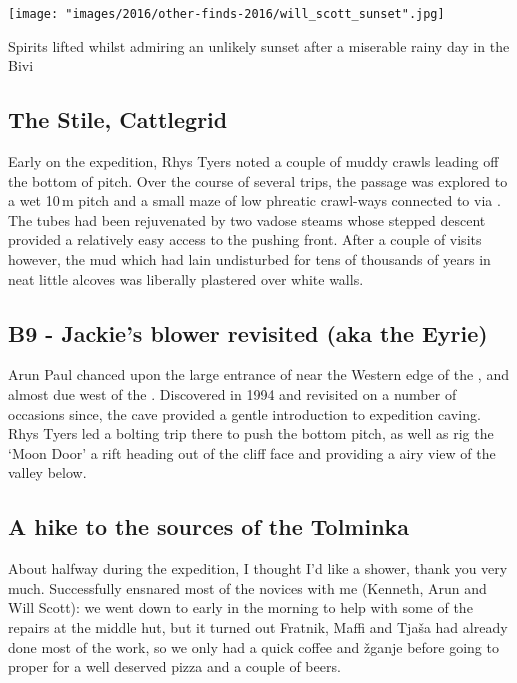\begin{marginfigure}
\checkoddpage \ifoddpage \forcerectofloat \else \forceversofloat \fi
\centering
 \texttt{[image: "images/2016/other-finds-2016/will\_scott\_sunset".jpg]} 
 \caption{Spirits lifted whilst admiring an unlikely sunset after a miserable rainy day in the Bivi }
 \label{Sunset}
\end{marginfigure}



\subsection{The Stile, Cattlegrid}
Early on the expedition, Rhys Tyers noted a couple of muddy crawls leading off the bottom of  pitch. Over the course of several trips, the  passage was explored to a wet 10\,m pitch and a small maze of low phreatic crawl-ways connected to  via . The tubes had been rejuvenated by two vadose steams whose stepped descent provided a relatively easy access to the pushing front. After a couple of visits however, the mud which had lain undisturbed for tens of thousands of years in neat little alcoves was liberally plastered over white walls.

\subsection{B9 - Jackie's blower revisited (aka the Eyrie)}
Arun Paul chanced upon the large entrance of  near the Western edge of the , and almost due west of the . Discovered in 1994 and revisited on a number of occasions since, the cave provided a gentle introduction to expedition caving. Rhys Tyers led a bolting trip there to push the bottom pitch, as well as rig the `Moon Door' a rift heading out of the cliff face and providing a airy view of the  valley below.

 \subsection{A hike to the sources of the Tolminka}
 About halfway during the expedition, I thought I'd like a shower, thank you very much. Successfully ensnared most of the novices with me (Kenneth, Arun and Will Scott): we went down to  early in the morning to help with some of the repairs at the middle hut, but it turned out Fratnik, Maffi and Tja\v{s}a had already done most of the work, so we only had a quick coffee and \v{z}ganje before going to  proper for a well deserved pizza and a couple of beers. 
 
